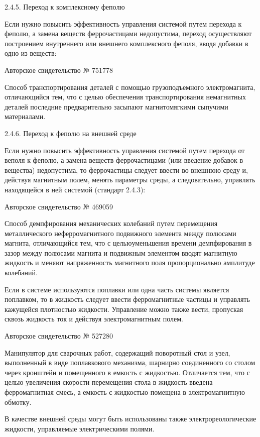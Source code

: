 2.4.5. Переход к комплексному феполю

Если нужно  повысить эффективность управления системой  путем перехода
к  феполю,  а  замена   веществ  феррочастицами  недопустима,  переход
осуществляют построением внутреннего или внешнего комплексного феполя,
вводя добавки в одно из веществ:


Авторское свидетельство № 751778

Способ   транспортирования    деталей   с    помощью   грузоподъемного
электромагнита,   отличающийся   тем,    что   с   целью   обеспечения
транспортирования   немагнитных   деталей   последние   предварительно
засыпают магнитомягкими сыпучими материалами.


2.4.6. Переход к феполю на внешней среде

Если нужно  повысить эффективность управления системой  путем перехода
от  веполя к  феполю, а  замена веществ  феррочастицами (или  введение
добавок  в вещества)  недопустима, то  феррочастицы следует  ввести во
внешнюю среду и,  действуя магнитным полем, менять  параметры среды, а
следовательно, управлять находящейся в ней системой (стандарт 2.4.3):


Авторское свидетельство № 469059

Способ   демпфирования   механических  колебаний   путем   перемещения
металлического  неферромагнитного подвижного  элемента между  полюсами
магнита, отличающийся тем, что с цельюуменьшения времени демпфирования
в зазор между полюсами магнита  и подвижным элементом вводят магнитную
жидкость  и  меняют   напряженность  магнитного  поля  пропорционально
амплитуде колебаний.

Если в системе  используются поплавки или одна  часть системы является
поплавком,  то  в жидкость  следует  ввести  ферромагнитные частицы  и
управлять кажущейся плотностью жидкости. Управление можно также вести,
пропуская сквозь жидкость ток и действуя электромагнитным полем.


Авторское свидетельство № 527280

Манипулятор для  сварочных работ,  содержащий поворотный стол  и узел,
выполненный в  виде поплавкового  механизма, шарнирно  соединенного со
столом через кронштейн и помещенного в емкость с жидкостью. Отличается
тем,  что с  целью увеличения  скорости перемещения  стола в  жидкость
введена  ферромагнитная  смесь,  а  емкость  с  жидкостью  помещена  в
электромагнитную обмотку.

В   качестве    внешней   среды   могут   быть    использованы   также
электрореологические жидкости, управляемые электрическими полями.


